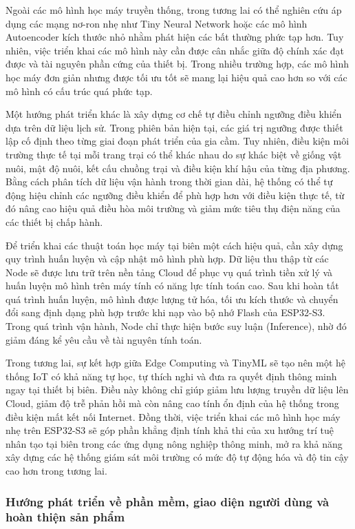 Ngoài các mô hình học máy truyền thống, trong tương lai có thể nghiên cứu áp dụng các mạng nơ-ron nhẹ như Tiny Neural Network hoặc các mô hình Autoencoder kích thước nhỏ nhằm phát hiện các bất thường phức tạp hơn. Tuy nhiên, việc triển khai các mô hình này cần được cân nhắc giữa độ chính xác đạt được và tài nguyên phần cứng của thiết bị. Trong nhiều trường hợp, các mô hình học máy đơn giản nhưng được tối ưu tốt sẽ mang lại hiệu quả cao hơn so với các mô hình có cấu trúc quá phức tạp.

Một hướng phát triển khác là xây dựng cơ chế tự điều chỉnh ngưỡng điều khiển dựa trên dữ liệu lịch sử. Trong phiên bản hiện tại, các giá trị ngưỡng được thiết lập cố định theo từng giai đoạn phát triển của gia cầm. Tuy nhiên, điều kiện môi trường thực tế tại mỗi trang trại có thể khác nhau do sự khác biệt về giống vật nuôi, mật độ nuôi, kết cấu chuồng trại và điều kiện khí hậu của từng địa phương. Bằng cách phân tích dữ liệu vận hành trong thời gian dài, hệ thống có thể tự động hiệu chỉnh các ngưỡng điều khiển để phù hợp hơn với điều kiện thực tế, từ đó nâng cao hiệu quả điều hòa môi trường và giảm mức tiêu thụ điện năng của các thiết bị chấp hành.

Để triển khai các thuật toán học máy tại biên một cách hiệu quả, cần xây dựng quy trình huấn luyện và cập nhật mô hình phù hợp. Dữ liệu thu thập từ các Node sẽ được lưu trữ trên nền tảng Cloud để phục vụ quá trình tiền xử lý và huấn luyện mô hình trên máy tính có năng lực tính toán cao. Sau khi hoàn tất quá trình huấn luyện, mô hình được lượng tử hóa, tối ưu kích thước và chuyển đổi sang định dạng phù hợp trước khi nạp vào bộ nhớ Flash của ESP32-S3. Trong quá trình vận hành, Node chỉ thực hiện bước suy luận (Inference), nhờ đó giảm đáng kể yêu cầu về tài nguyên tính toán.

Trong tương lai, sự kết hợp giữa Edge Computing và TinyML sẽ tạo nên một hệ thống IoT có khả năng tự học, tự thích nghi và đưa ra quyết định thông minh ngay tại thiết bị biên. Điều này không chỉ giúp giảm lưu lượng truyền dữ liệu lên Cloud, giảm độ trễ phản hồi mà còn nâng cao tính ổn định của hệ thống trong điều kiện mất kết nối Internet. Đồng thời, việc triển khai các mô hình học máy nhẹ trên ESP32-S3 sẽ góp phần khẳng định tính khả thi của xu hướng trí tuệ nhân tạo tại biên trong các ứng dụng nông nghiệp thông minh, mở ra khả năng xây dựng các hệ thống giám sát môi trường có mức độ tự động hóa và độ tin cậy cao hơn trong tương lai.

\subsubsection{Hướng phát triển về phần mềm, giao diện người dùng và hoàn thiện sản phẩm}

